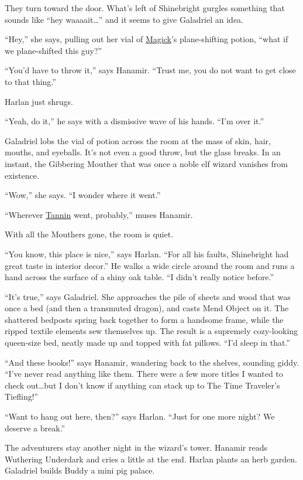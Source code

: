 \documentclass[smalldemyvopaper,11pt,twoside,onecolumn,openright,extrafontsizes]{memoir}
\begin{document}
They turn toward the door. What's left of Shinebright gurgles something
that sounds like ``hey waaaait\ldots{}'' and it seems to give Galadriel
an idea.

``Hey,'' she says, pulling out her vial of
\href{/characters/magick/}{Magick}'s plane-shifting potion, ``what if we
plane-shifted this guy?''

``You'd have to throw it,'' says Hanamir. ``Trust me, you do not want to
get close to that thing.''

Harlan just shrugs.

``Yeah, do it,'' he says with a dismissive wave of his hands. ``I'm over
it.''

Galadriel lobs the vial of potion across the room at the mass of skin,
hair, mouths, and eyeballs. It's not even a good throw, but the glass
breaks. In an instant, the Gibbering Mouther that was once a noble elf
wizard vanishes from existence.

``Wow,'' she says. ``I wonder where it went.''

``Wherever \href{/characters/tannin/}{Tannin} went, probably,'' muses
Hanamir.

With all the Mouthers gone, the room is quiet.

``You know, this place is nice,'' says Harlan. ``For all his faults,
Shinebright had great taste in interior decor.'' He walks a wide circle
around the room and runs a hand across the surface of a shiny oak table.
``I didn't really notice before.''

``It's true,'' says Galadriel. She approaches the pile of sheets and
wood that was once a bed (and then a transmuted dragon), and casts Mend
Object on it. The shattered bedposts spring back together to form a
handsome frame, while the ripped textile elements sew themselves up. The
result is a supremely cozy-looking queen-size bed, neatly made up and
topped with fat pillows. ``I'd sleep in that.''

``And these books!'' says Hanamir, wandering back to the shelves,
sounding giddy. ``I've never read anything like them. There were a few
more titles I wanted to check out\ldots but I don't know if anything can
stack up to The Time Traveler's Tiefling!''

``Want to hang out here, then?'' says Harlan. ``Just for one more night?
We deserve a break.''

The adventurers stay another night in the wizard's tower. Hanamir reads
Wuthering Underdark and cries a little at the end. Harlan plants an herb
garden. Galadriel builds Buddy a mini pig palace.
\end{document}
